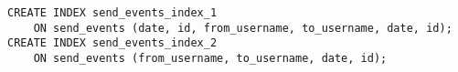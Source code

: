 \documentclass[../../../../main]{subfiles}
\begin{document}
    \begin{mdframed}
        \begin{verbatim}
CREATE INDEX send_events_index_1
    ON send_events (date, id, from_username, to_username, date, id);
CREATE INDEX send_events_index_2
    ON send_events (from_username, to_username, date, id);
        \end{verbatim}
    \end{mdframed}
    \label{fig:web_api-index-definication}
\end{document}
